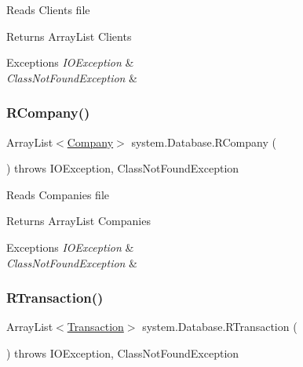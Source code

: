 Reads Clients file \begin{DoxyReturn}{Returns}
Array\+List Clients 
\end{DoxyReturn}

\begin{DoxyExceptions}{Exceptions}
{\em I\+O\+Exception} & \\
\hline
{\em Class\+Not\+Found\+Exception} & \\
\hline
\end{DoxyExceptions}
\mbox{\label{classsystem_1_1_database_a8aa0cd11f470af2f79e39447ded74416}} 
\subsubsection{\texorpdfstring{R\+Company()}{RCompany()}}
{\footnotesize\ttfamily Array\+List$<$\mbox{\hyperlink{classmodules_1_1company_1_1_company}{Company}}$>$ system.\+Database.\+R\+Company (\begin{DoxyParamCaption}{ }\end{DoxyParamCaption}) throws I\+O\+Exception, Class\+Not\+Found\+Exception\hspace{0.3cm}{\ttfamily [inline]}}

Reads Companies file \begin{DoxyReturn}{Returns}
Array\+List Companies 
\end{DoxyReturn}

\begin{DoxyExceptions}{Exceptions}
{\em I\+O\+Exception} & \\
\hline
{\em Class\+Not\+Found\+Exception} & \\
\hline
\end{DoxyExceptions}
\mbox{\label{classsystem_1_1_database_a699e545bc13bed8b01d1fa3748915656}} 
\subsubsection{\texorpdfstring{R\+Transaction()}{RTransaction()}}
{\footnotesize\ttfamily Array\+List$<$\mbox{\hyperlink{classmodules_1_1center_1_1_transaction}{Transaction}}$>$ system.\+Database.\+R\+Transaction (\begin{DoxyParamCaption}{ }\end{DoxyParamCaption}) throws I\+O\+Exception, Class\+Not\+Found\+Exception\hspace{0.3cm}{\ttfamily [inline]}}

